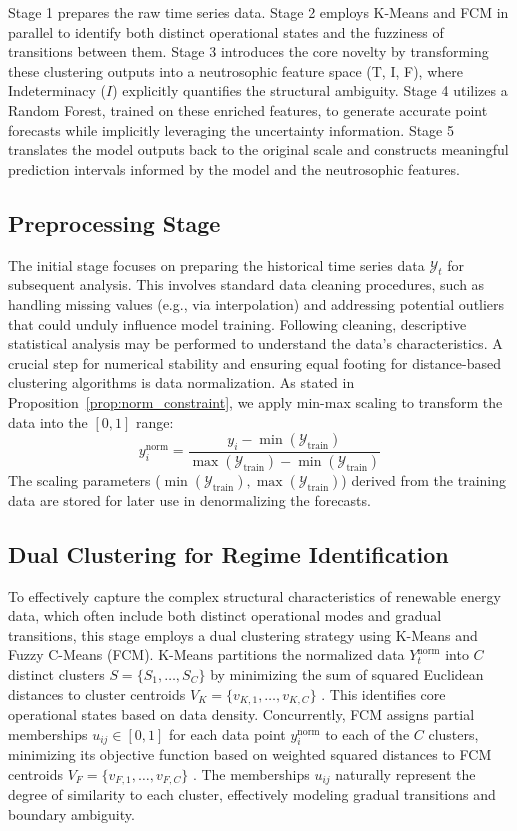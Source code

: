 \documentclass[review,3p,times]{elsarticle}
\begin{document}
Stage 1 prepares the raw time series data. Stage 2 employs K-Means and FCM in parallel to identify both distinct operational states and the fuzziness of transitions between them. Stage 3 introduces the core novelty by transforming these clustering outputs into a neutrosophic feature space (T, I, F), where Indeterminacy ($I$) explicitly quantifies the structural ambiguity. Stage 4 utilizes a Random Forest, trained on these enriched features, to generate accurate point forecasts while implicitly leveraging the uncertainty information. Stage 5 translates the model outputs back to the original scale and constructs meaningful prediction intervals informed by the model and the neutrosophic features.

\subsection{Preprocessing Stage}
\label{sec:preprocessing}
The initial stage focuses on preparing the historical time series data $\mathcal{Y}_t$ for subsequent analysis. This involves standard data cleaning procedures, such as handling missing values (e.g., via interpolation) and addressing potential outliers that could unduly influence model training. Following cleaning, descriptive statistical analysis may be performed to understand the data's characteristics. A crucial step for numerical stability and ensuring equal footing for distance-based clustering algorithms is data normalization. As stated in Proposition~\ref{prop:norm_constraint}, we apply min-max scaling to transform the data into the $[0,1]$ range:
\begin{equation}
    y_i^{\text{norm}} = \frac{y_i - \min(\mathcal{Y}_{\text{train}})}{\max(\mathcal{Y}_{\text{train}}) - \min(\mathcal{Y}_{\text{train}})}
\end{equation}
The scaling parameters ($\min(\mathcal{Y}_{\text{train}}), \max(\mathcal{Y}_{\text{train}})$) derived from the training data are stored for later use in denormalizing the forecasts.

\subsection{Dual Clustering for Regime Identification}
\label{sec:dual_clustering}
To effectively capture the complex structural characteristics of renewable energy data, which often include both distinct operational modes and gradual transitions, this stage employs a dual clustering strategy using K-Means and Fuzzy C-Means (FCM). K-Means partitions the normalized data $Y_t^{\text{norm}}$ into $C$ distinct clusters $S = \{S_1, \dots, S_C\}$ by minimizing the sum of squared Euclidean distances to cluster centroids $V_K = \{v_{K,1}, \dots, v_{K,C}\}$ \cite{macqueen1967some}. This identifies core operational states based on data density. Concurrently, FCM assigns partial memberships $u_{ij} \in [0,1]$ for each data point $y_i^{\text{norm}}$ to each of the $C$ clusters, minimizing its objective function based on weighted squared distances to FCM centroids $V_F = \{v_{F,1}, \dots, v_{F,C}\}$ \cite{bezdek1984fcm}. The memberships $u_{ij}$ naturally represent the degree of similarity to each cluster, effectively modeling gradual transitions and boundary ambiguity.
\end{document}
